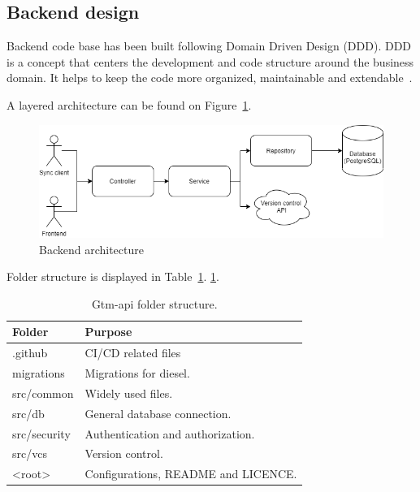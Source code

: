 \subsection{Backend design}\label{subsec:backend-design}
Backend code base has been built following Domain Driven Design (DDD).
DDD is a concept that centers the development and code structure around the business domain.
It helps to keep the code more organized, maintainable and extendable~\cite{domain-driven-design}.

A layered architecture can be found on Figure~\ref{fig:backend-layered-diagram}.
\begin{figure}[H]
    \includegraphics[width=\textwidth]{figures/backend_layered_diagram}
    \caption{Backend architecture}
    \label{fig:backend-layered-diagram}
\end{figure}

Folder structure is displayed in Table~\ref{tab:gtm-api-folder-structure}.
\ref{tab:gtm-api-folder-structure}.
\begin{table}[h]
    \centering
    \begin{tabular}{ | p{3cm} | p{10cm} |}
        \hline
        Folder & Purpose\\
        \hline
        .github & CI/CD related files\\
        \hline
        migrations & Migrations for diesel. \\
        \hline
        src/common & Widely used files.\\
        \hline
        src/db & General database connection.\\
        \hline
        src/security & Authentication and authorization.\\
        \hline
        src/vcs & Version control.\\
        \hline
        <root> & Configurations, README and LICENCE.\\
        \hline
    \end{tabular}
    \caption{Gtm-api folder structure.}
    \label{tab:gtm-api-folder-structure}
\end{table}

